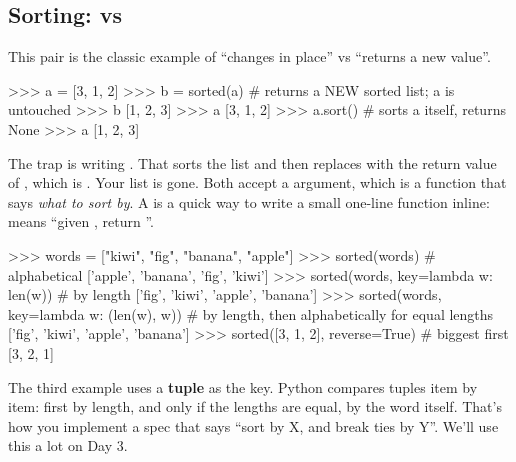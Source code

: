 \documentclass[10pt,a4paper]{article}
\begin{document}
\subsection{Sorting:  vs }
This pair is the classic example of “changes in place” vs “returns a new value”.
\begin{txtcode}
>>> a = [3, 1, 2]
>>> b = sorted(a)        # returns a NEW sorted list; a is untouched
>>> b
[1, 2, 3]
>>> a
[3, 1, 2]
>>> a.sort()             # sorts a itself, returns None
>>> a
[1, 2, 3]
\end{txtcode}
The trap is writing . That sorts the list and then replaces  with the return value of , which is . Your list is gone.
Both accept a  argument, which is a function that says \emph{what to sort by}. A  is a quick way to write a small one-line function inline:  means “given , return ”.
\begin{txtcode}
>>> words = ["kiwi", "fig", "banana", "apple"]
>>> sorted(words)                            # alphabetical
['apple', 'banana', 'fig', 'kiwi']
>>> sorted(words, key=lambda w: len(w))      # by length
['fig', 'kiwi', 'apple', 'banana']
>>> sorted(words, key=lambda w: (len(w), w)) # by length, then alphabetically for equal lengths
['fig', 'kiwi', 'apple', 'banana']
>>> sorted([3, 1, 2], reverse=True)          # biggest first
[3, 2, 1]
\end{txtcode}
The third example uses a \textbf{tuple} as the key. Python compares tuples item by item: first by length, and only if the lengths are equal, by the word itself. That’s how you implement a spec that says “sort by X, and break ties by Y”. We’ll use this a lot on Day 3.
\end{document}
